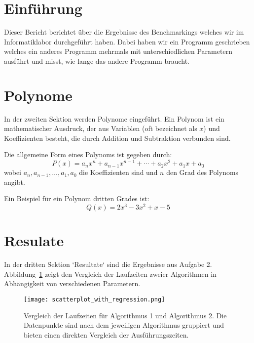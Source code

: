 \documentclass{article} %
\begin{document}
\section*{Einführung} Dieser Bericht berichtet über die Ergebnisse des Benchmarkings welches wir im Informatiklabor durchgeführt haben. Dabei haben wir ein Programm geschrieben welches ein anderes Programm mehrmals mit unterschiedlichen Parametern ausführt und misst, wie lange das andere Programm braucht.

\section*{Polynome}
In der zweiten Sektion werden Polynome eingeführt. Ein Polynom ist ein mathematischer Ausdruck, der aus Variablen (oft bezeichnet als $x$) und Koeffizienten besteht, die durch Addition und Subtraktion verbunden sind.

Die allgemeine Form eines Polynoms ist gegeben durch:
\[ P(x) = a_n x^n + a_{n-1} x^{n-1} + \cdots + a_2 x^2 + a_1 x + a_0 \]
wobei $a_n, a_{n-1}, \ldots, a_1, a_0$ die Koeffizienten sind und $n$ den Grad des Polynoms angibt.

Ein Beispiel für ein Polynom dritten Grades ist:
\[ Q(x) = 2x^3 - 3x^2 + x - 5 \]

\section*{Resulate}
In der dritten Sektion `Resultate` sind die Ergebnisse aus Aufgabe 2. Abbildung~\ref{fig:laufzeitplot} zeigt den Vergleich der Laufzeiten zweier Algorithmen in Abhängigkeit von verschiedenen Parametern.

\begin{figure}[h]
    \centering
    \texttt{[image: scatterplot\_with\_regression.png]}
    \caption{Vergleich der Laufzeiten für Algorithmus 1 und Algorithmus 2. Die Datenpunkte sind nach dem jeweiligen Algorithmus gruppiert und bieten einen direkten Vergleich der Ausführungszeiten.}
    \label{fig:laufzeitplot}
\end{figure}
\end{document}
